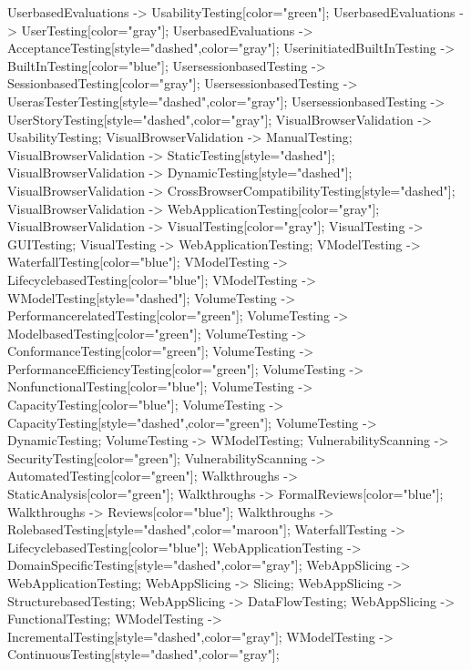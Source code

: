 \documentclass{article}
\begin{document}
{UserbasedEvaluations -> UsabilityTesting[color="green"];
UserbasedEvaluations -> UserTesting[color="gray"];
UserbasedEvaluations -> AcceptanceTesting[style="dashed",color="gray"];
UserinitiatedBuiltInTesting -> BuiltInTesting[color="blue"];
UsersessionbasedTesting -> SessionbasedTesting[color="gray"];
UsersessionbasedTesting -> UserasTesterTesting[style="dashed",color="gray"];
UsersessionbasedTesting -> UserStoryTesting[style="dashed",color="gray"];
VisualBrowserValidation -> UsabilityTesting;
VisualBrowserValidation -> ManualTesting;
VisualBrowserValidation -> StaticTesting[style="dashed"];
VisualBrowserValidation -> DynamicTesting[style="dashed"];
VisualBrowserValidation -> CrossBrowserCompatibilityTesting[style="dashed"];
VisualBrowserValidation -> WebApplicationTesting[color="gray"];
VisualBrowserValidation -> VisualTesting[color="gray"];
VisualTesting -> GUITesting;
VisualTesting -> WebApplicationTesting;
VModelTesting -> WaterfallTesting[color="blue"];
VModelTesting -> LifecyclebasedTesting[color="blue"];
VModelTesting -> WModelTesting[style="dashed"];
VolumeTesting -> PerformancerelatedTesting[color="green"];
VolumeTesting -> ModelbasedTesting[color="green"];
VolumeTesting -> ConformanceTesting[color="green"];
VolumeTesting -> PerformanceEfficiencyTesting[color="green"];
VolumeTesting -> NonfunctionalTesting[color="blue"];
VolumeTesting -> CapacityTesting[color="blue"];
VolumeTesting -> CapacityTesting[style="dashed",color="green"];
VolumeTesting -> DynamicTesting;
VolumeTesting -> WModelTesting;
VulnerabilityScanning -> SecurityTesting[color="green"];
VulnerabilityScanning -> AutomatedTesting[color="green"];
Walkthroughs -> StaticAnalysis[color="green"];
Walkthroughs -> FormalReviews[color="blue"];
Walkthroughs -> Reviews[color="blue"];
Walkthroughs -> RolebasedTesting[style="dashed",color="maroon"];
WaterfallTesting -> LifecyclebasedTesting[color="blue"];
WebApplicationTesting -> DomainSpecificTesting[style="dashed",color="gray"];
WebAppSlicing -> WebApplicationTesting;
WebAppSlicing -> Slicing;
WebAppSlicing -> StructurebasedTesting;
WebAppSlicing -> DataFlowTesting;
WebAppSlicing -> FunctionalTesting;
WModelTesting -> IncrementalTesting[style="dashed",color="gray"];
WModelTesting -> ContinuousTesting[style="dashed",color="gray"];

}
\end{document}
